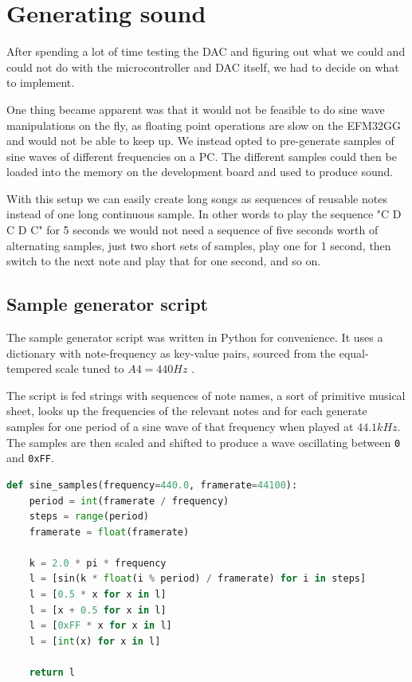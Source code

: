 \section{Generating sound}
After spending a lot of time testing the DAC and figuring out what we could and could not do with the microcontroller and DAC itself, we had to decide on what to implement.

One thing became apparent was that it would not be feasible to do sine wave manipulations on the fly, as floating point operations are slow on the EFM32GG and would not be able to keep up. We instead opted to pre-generate samples of sine waves of different frequencies on a PC. The different samples could then be loaded into the memory on the development board and used to produce sound.

With this setup we can easily create long songs as sequences of reusable notes instead of one long continuous sample. In other words to play the sequence "C D C D C" for 5 seconds we would not need a sequence of five seconds worth of alternating samples, just two short sets of samples, play one for 1 second, then switch to the next note and play that for one second, and so on.

\subsection{Sample generator script}
The sample generator script was written in Python for convenience. It uses a dictionary with note-frequency as key-value pairs, sourced from the equal-tempered scale tuned to $A4 = 440Hz$ \cite{notefreqs}.

The script is fed strings with sequences of note names, a sort of primitive musical sheet, looks up the frequencies of the relevant notes and for each generate samples for one period of a sine wave of that frequency when played at $44.1kHz$. The samples are then scaled and shifted to produce a wave oscillating between \texttt{0} and \texttt{0xFF}.

\begin{minipage}{\linewidth}
\begin{lstlisting}[language=Python, label=sine_samples, caption=Sample generation]
def sine_samples(frequency=440.0, framerate=44100):
    period = int(framerate / frequency)
    steps = range(period)
    framerate = float(framerate)

    k = 2.0 * pi * frequency
    l = [sin(k * float(i % period) / framerate) for i in steps]
    l = [0.5 * x for x in l]
    l = [x + 0.5 for x in l]
    l = [0xFF * x for x in l]
    l = [int(x) for x in l]

    return l
\end{lstlisting}
\end{minipage}

